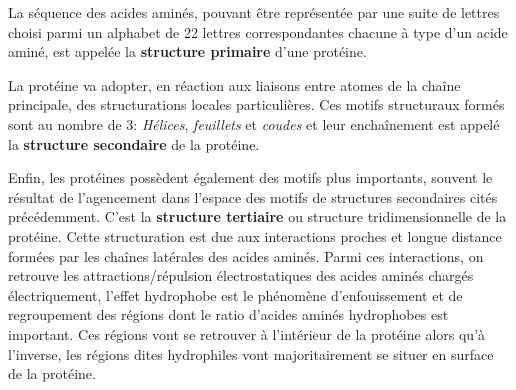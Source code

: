 

La séquence des acides aminés, pouvant être représentée par une suite de lettres choisi parmi un alphabet de 22 lettres correspondantes chacune à type d'un acide aminé, est appelée la \textbf{structure primaire} d'une protéine.

La protéine va adopter, en réaction aux liaisons entre atomes de la chaîne principale, des structurations locales particulières. Ces motifs structuraux formés sont au nombre de 3: \textit{Hélices}, \textit{feuillets} et \textit{coudes} et leur enchaînement est appelé la \textbf{structure secondaire} de la protéine.

Enfin, les protéines possèdent également des motifs plus importants, souvent le résultat de l'agencement dans l'espace des motifs de structures secondaires cités précédemment. C'est la \textbf{structure tertiaire} ou structure tridimensionnelle de la protéine. 
Cette structuration est due aux interactions proches et longue distance formées par les chaînes latérales des acides aminés. Parmi ces interactions, on retrouve les attractions/répulsion électrostatiques des acides aminés chargés électriquement, l'effet hydrophobe est le phénomène d'enfouissement et de regroupement des régions dont le ratio d'acides aminés hydrophobes est important. Ces régions vont se retrouver à l'intérieur de la protéine alors qu'à l'inverse, les régions dites hydrophiles vont majoritairement se situer en surface de la protéine.


